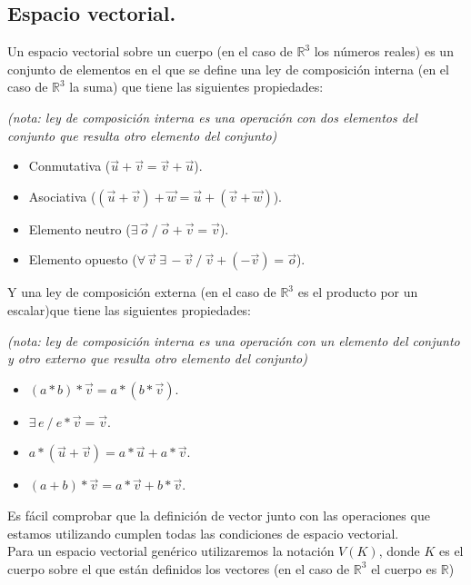 \documentclass[a4paper,11pt,answers]{exam}
\begin{document}
\subsection{Espacio vectorial.}
Un espacio vectorial sobre un cuerpo (en el caso de $\mathbb{R}^3$ los números reales) es un conjunto de elementos en el que se define una ley de composición interna (en el caso de $\mathbb{R}^3$ la suma) que tiene las siguientes propiedades:

\begin{small}{\emph{(nota: ley de composición interna es una operación con dos elementos del conjunto que resulta otro elemento del conjunto)}}
\end{small}
\begin{itemize}
	\item Conmutativa ($\vec u + \vec v = \vec v + \vec u$).
	\item Asociativa ($(\vec u + \vec v ) + \vec w = \vec u + (\vec v + \vec w)$).
	\item Elemento neutro ($\exists\, \vec o\ /\ \vec o + \vec v = \vec v$).
	\item Elemento opuesto ($\forall\,\vec v\ \exists\,-\vec v\ /\ \vec v + (-\vec v) = \vec o$).
\end{itemize}

Y una ley de composición externa (en el caso de $\mathbb{R}^3$ es el producto por un escalar)que tiene las siguientes propiedades:

\begin{small}{\emph{(nota: ley de composición interna es una operación con un elemento del conjunto y otro externo que resulta otro elemento del conjunto)}}
\end{small}
\begin{itemize}
	\item $(a*b)* \vec v = a*(b*\vec v)$.
	\item $\exists\,e\ /\ e*\vec v = \vec v$.
	\item $a*(\vec u + \vec v) = a*\vec u + a*\vec v$.
	\item $(a+ b)*\vec v = a*\vec v + b*\vec v$.
\end{itemize}

Es fácil comprobar que la definición de vector junto con las operaciones que estamos utilizando cumplen todas las condiciones de espacio vectorial.\\

Para un espacio vectorial genérico utilizaremos la notación $V(K)$, donde $K$ es el cuerpo sobre el que están definidos los vectores (en el caso de $\mathbb{R}^3$ el cuerpo es $\mathbb{R}$)
\end{document}
